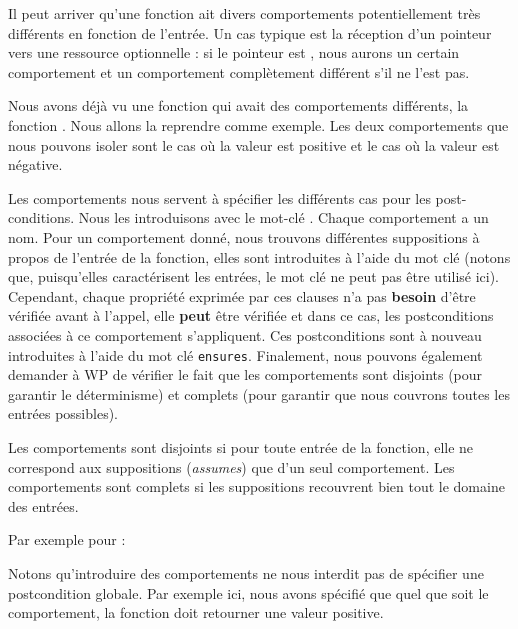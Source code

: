 Il peut arriver qu'une fonction ait divers comportements potentiellement très
différents en fonction de l'entrée. Un cas typique est la réception d'un
pointeur vers une ressource optionnelle : si le pointeur est , nous
aurons un certain comportement et un comportement complètement différent s'il ne
l'est pas.



Nous avons déjà vu une fonction qui avait des comportements différents, la
fonction . Nous allons la reprendre comme exemple. Les deux
comportements que nous pouvons isoler sont le cas où la valeur est positive et
le cas où la valeur est négative.



Les comportements nous servent à spécifier les différents cas pour les
post-conditions. Nous les introduisons avec le mot-clé .
Chaque comportement a un nom. Pour un comportement donné, nous trouvons
différentes suppositions à propos de l'entrée de la fonction, elles sont
introduites à l'aide du mot clé  (notons que, puisqu'elles
caractérisent les entrées, le mot clé  ne peut
pas être utilisé ici). Cependant, chaque propriété exprimée par ces clauses
n'a pas \textbf{besoin} d'être vérifiée avant à l'appel, elle \textbf{peut}
être vérifiée et dans ce cas, les postconditions associées à ce comportement
s'appliquent. Ces postconditions sont à nouveau introduites à l'aide du mot
clé \texttt{ensures}. Finalement, nous pouvons également demander à WP
de vérifier le fait que les comportements sont disjoints (pour garantir
le déterminisme) et complets (pour garantir que nous couvrons toutes les
entrées possibles).



Les comportements sont disjoints si pour toute entrée de la fonction, elle ne
correspond aux suppositions (\textit{assumes}) que d'un seul comportement. Les
comportements sont complets si les suppositions recouvrent bien tout le domaine
des entrées.



Par exemple pour  :





Notons qu'introduire des comportements ne nous interdit pas de spécifier une
postcondition globale. Par exemple ici, nous avons spécifié que quel que soit
le comportement, la fonction doit retourner une valeur positive.


